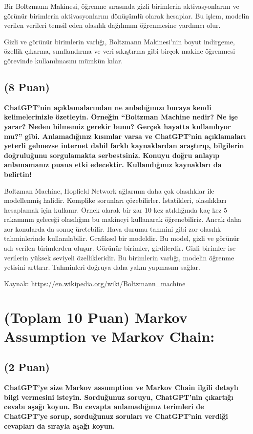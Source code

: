 \documentclass[11pt]{article}
\begin{document}
Bir Boltzmann Makinesi, öğrenme sırasında gizli birimlerin aktivasyonlarını ve görünür birimlerin aktivasyonlarını dönüşümlü olarak hesaplar. Bu işlem, modelin verilen verileri temsil eden olasılık dağılımını öğrenmesine yardımcı olur.

Gizli ve görünür birimlerin varlığı, Boltzmann Makinesi'nin boyut indirgeme, özellik çıkarma, sınıflandırma ve veri sıkıştırma gibi birçok makine öğrenmesi görevinde kullanılmasını mümkün kılar.

\subsection{(8 Puan)} \textbf{ChatGPT’nin açıklamalarından ne anladığınızı buraya kendi kelimelerinizle özetleyin. Örneğin ``Boltzman Machine nedir? Ne işe yarar? Neden bilmemiz gerekir bunu? Gerçek hayatta kullanılıyor mu?'' gibi. Anlamadığınız kısımlar varsa ve ChatGPT’nin açıklamaları yeterli gelmezse internet dahil farklı kaynaklardan araştırıp, bilgilerin doğruluğunu sorgulamakta serbestsiniz. Konuyu doğru anlayıp anlamamanız puana etki edecektir. Kullandığınız kaynakları da belirtin!}

Boltzman Machine, Hopfield Network ağlarının daha çok olasılıklar ile modellenmiş halidir. Komplike sorunları çözebilirler. İstatikleri, olasılıkları hesaplamak için kullanır. Örnek olarak bir zar 10 kez atıldığında kaç kez 5 rakamının geleceği olasılığını bu makineyi kullanarak öğrenebiliriz. Ancak daha zor konularda da sonuç üretebilir. Hava durumu tahmini gibi zor olasılık tahminlerinde kullanılabilir. Grafiksel bir modeldir. Bu model, gizli ve görünür adı verilen birimlerden oluşur. Görünür birimler, girdilerdir. Gizli birimler ise verilerin yüksek seviyeli özellikleridir. Bu birimlerin varlığı, modelin öğrenme yetisini arttırır. Tahminleri doğruya daha yakın yapmasını sağlar.

Kaynak: \url{https://en.wikipedia.org/wiki/Boltzmann_machine}

\section{(Toplam 10 Puan) Markov Assumption ve Markov Chain:}

\subsection{(2 Puan)} \textbf{ChatGPT’ye size Markov assumption ve Markov Chain ilgili detaylı bilgi vermesini isteyin. Sorduğunuz soruyu, ChatGPT'nin çıkartığı cevabı aşağı koyun. Bu cevapta anlamadığınız terimleri de ChatGPT’ye sorup, sorduğunuz soruları ve ChatGPT’nin verdiği cevapları da sırayla aşağı koyun.}
\end{document}
